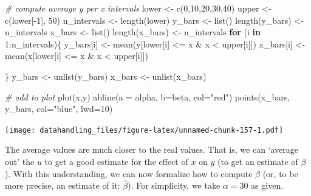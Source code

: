 \documentclass[
  12pt,
]{style/krantz}
\newenvironment{Shaded}{\begin{snugshade}}{\end{snugshade}}
\newcommand{\AttributeTok}[1]{\textcolor[rgb]{0.77,0.63,0.00}{#1}}
\newcommand{\CommentTok}[1]{\textcolor[rgb]{0.56,0.35,0.01}{\textit{#1}}}
\newcommand{\ControlFlowTok}[1]{\textcolor[rgb]{0.13,0.29,0.53}{\textbf{#1}}}
\newcommand{\DecValTok}[1]{\textcolor[rgb]{0.00,0.00,0.81}{#1}}
\newcommand{\FunctionTok}[1]{\textcolor[rgb]{0.00,0.00,0.00}{#1}}
\newcommand{\NormalTok}[1]{#1}
\newcommand{\OtherTok}[1]{\textcolor[rgb]{0.56,0.35,0.01}{#1}}
\newcommand{\SpecialCharTok}[1]{\textcolor[rgb]{0.00,0.00,0.00}{#1}}
\newcommand{\StringTok}[1]{\textcolor[rgb]{0.31,0.60,0.02}{#1}}
\begin{document}
\begin{Shaded}
\begin{Highlighting}[]
\CommentTok{\# compute average y per x intervals}
\NormalTok{lower }\OtherTok{\textless{}{-}} \FunctionTok{c}\NormalTok{(}\DecValTok{0}\NormalTok{,}\DecValTok{10}\NormalTok{,}\DecValTok{20}\NormalTok{,}\DecValTok{30}\NormalTok{,}\DecValTok{40}\NormalTok{)}
\NormalTok{upper }\OtherTok{\textless{}{-}} \FunctionTok{c}\NormalTok{(lower[}\SpecialCharTok{{-}}\DecValTok{1}\NormalTok{], }\DecValTok{50}\NormalTok{)}
\NormalTok{n\_intervals }\OtherTok{\textless{}{-}} \FunctionTok{length}\NormalTok{(lower)}
\NormalTok{y\_bars }\OtherTok{\textless{}{-}} \FunctionTok{list}\NormalTok{()}
\FunctionTok{length}\NormalTok{(y\_bars) }\OtherTok{\textless{}{-}}\NormalTok{ n\_intervals}
\NormalTok{x\_bars }\OtherTok{\textless{}{-}} \FunctionTok{list}\NormalTok{()}
\FunctionTok{length}\NormalTok{(x\_bars) }\OtherTok{\textless{}{-}}\NormalTok{ n\_intervals}
\ControlFlowTok{for}\NormalTok{ (i }\ControlFlowTok{in} \DecValTok{1}\SpecialCharTok{:}\NormalTok{n\_intervals)\{}
\NormalTok{  y\_bars[i] }\OtherTok{\textless{}{-}} \FunctionTok{mean}\NormalTok{(y[lower[i] }\SpecialCharTok{\textless{}=}\NormalTok{ x }\SpecialCharTok{\&}\NormalTok{ x }\SpecialCharTok{\textless{}}\NormalTok{ upper[i]])}
\NormalTok{  x\_bars[i] }\OtherTok{\textless{}{-}} \FunctionTok{mean}\NormalTok{(x[lower[i] }\SpecialCharTok{\textless{}=}\NormalTok{ x }\SpecialCharTok{\&}\NormalTok{ x }\SpecialCharTok{\textless{}}\NormalTok{ upper[i]])}

\NormalTok{\}}
\NormalTok{y\_bars }\OtherTok{\textless{}{-}} \FunctionTok{unlist}\NormalTok{(y\_bars)}
\NormalTok{x\_bars }\OtherTok{\textless{}{-}} \FunctionTok{unlist}\NormalTok{(x\_bars)}

\CommentTok{\# add to plot}
\FunctionTok{plot}\NormalTok{(x,y)}
\FunctionTok{abline}\NormalTok{(}\AttributeTok{a =}\NormalTok{ alpha, }\AttributeTok{b=}\NormalTok{beta, }\AttributeTok{col=}\StringTok{"red"}\NormalTok{)}
\FunctionTok{points}\NormalTok{(x\_bars, y\_bars, }\AttributeTok{col=}\StringTok{"blue"}\NormalTok{, }\AttributeTok{lwd=}\DecValTok{10}\NormalTok{)}
\end{Highlighting}
\end{Shaded}

\texttt{[image: datahandling\_files/figure-latex/unnamed-chunk-157-1.pdf]}

The average values are much closer to the real values. That is, we can `average out' the \(u\) to get a good estimate for the effect of \(x\) on \(y\) (to get an estimate of \(\beta\)). With this understanding, we can now formalize how to compute \(\beta\) (or, to be more precise, an estimate of it: \(\hat{\beta}\)). For simplicity, we take \(\alpha=30\) as given.
\end{document}
